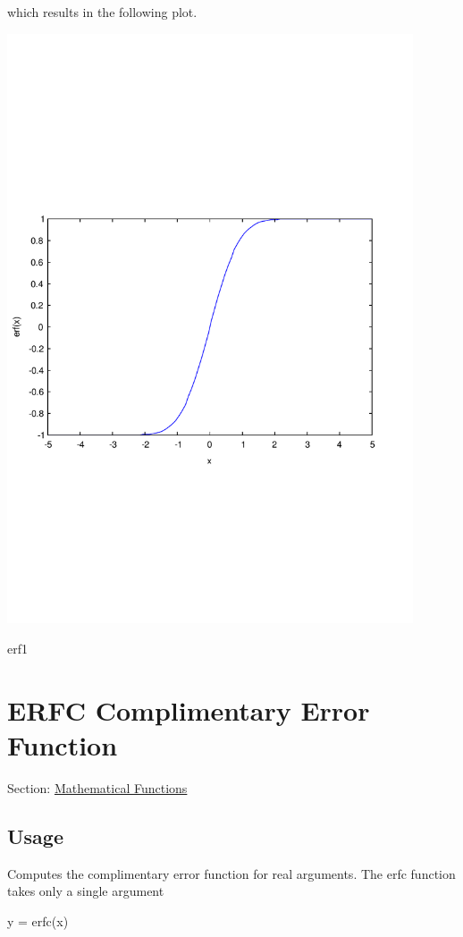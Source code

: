which results in the following plot.  
\begin{DoxyImage}
\includegraphics[width=12cm]{erf1}
\caption{erf1}
\end{DoxyImage}
 \hypertarget{mathfunctions_erfc}{}\section{E\-R\-F\-C Complimentary Error Function}\label{mathfunctions_erfc}
Section\-: \hyperlink{sec_mathfunctions}{Mathematical Functions} \hypertarget{vtkwidgets_vtkxyplotwidget_Usage}{}\subsection{Usage}\label{vtkwidgets_vtkxyplotwidget_Usage}
Computes the complimentary error function for real arguments. The {\ttfamily erfc} function takes only a single argument \begin{DoxyVerb}  y = erfc(x)
\end{DoxyVerb}

